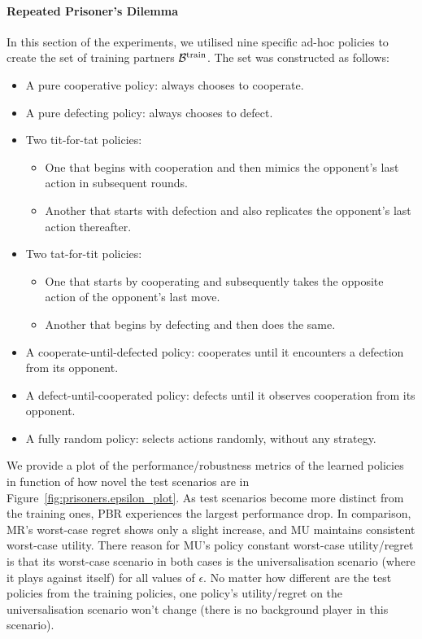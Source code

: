 \paragraph{Repeated Prisoner's Dilemma}
In this section of the experiments, we utilised nine specific ad-hoc policies to create the set of training partners $\mathcal{B}^\text{train}$. The set was constructed as follows:
\begin{itemize}
    \item A pure cooperative policy: always chooses to cooperate.
    \item A pure defecting policy: always chooses to defect.
    \item Two tit-for-tat policies: \begin{itemize}
        \item One that begins with cooperation and then mimics the opponent's last action in subsequent rounds.
        \item Another that starts with defection and also replicates the opponent's last action thereafter.
    \end{itemize}
    \item Two tat-for-tit policies: \begin{itemize}
        \item One that starts by cooperating and subsequently takes the opposite action of the opponent's last move.
        \item Another that begins by defecting and then does the same.
    \end{itemize}
    \item A cooperate-until-defected policy: cooperates until it encounters a defection from its opponent.
    \item A defect-until-cooperated policy: defects until it observes cooperation from its opponent.
    \item A fully random policy: selects actions randomly, without any strategy.
\end{itemize}
We provide a plot of the performance/robustness metrics of the learned policies in function of how novel the test scenarios are in Figure~\ref{fig:prisoners.epsilon_plot}. As test scenarios become more distinct from the training ones, PBR experiences the largest performance drop. In comparison, MR's worst-case regret shows only a slight increase, and MU maintains consistent worst-case utility. There reason for MU's policy constant worst-case utility/regret is that its worst-case scenario in both cases is the universalisation scenario (where it plays against itself) for all values of $\epsilon$. No matter how different are the test policies from the training policies, one policy's utility/regret on the universalisation scenario won't change (there is no background player in this scenario).


